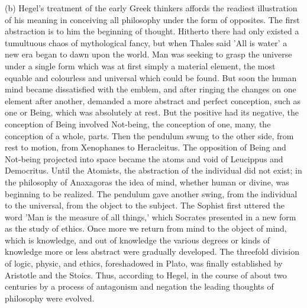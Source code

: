 \documentclass[11pt,letter]{article}
\begin{document}
\par  (b) Hegel's treatment of the early Greek thinkers affords the readiest illustration of his meaning in conceiving all philosophy under the form of opposites. The first abstraction is to him the beginning of thought. Hitherto there had only existed a tumultuous chaos of mythological fancy, but when Thales said 'All is water' a new era began to dawn upon the world. Man was seeking to grasp the universe under a single form which was at first simply a material element, the most equable and colourless and universal which could be found. But soon the human mind became dissatisfied with the emblem, and after ringing the changes on one element after another, demanded a more abstract and perfect conception, such as one or Being, which was absolutely at rest. But the positive had its negative, the conception of Being involved Not-being, the conception of one, many, the conception of a whole, parts. Then the pendulum swung to the other side, from rest to motion, from Xenophanes to Heracleitus. The opposition of Being and Not-being projected into space became the atoms and void of Leucippus and Democritus. Until the Atomists, the abstraction of the individual did not exist; in the philosophy of Anaxagoras the idea of mind, whether human or divine, was beginning to be realized. The pendulum gave another swing, from the individual to the universal, from the object to the subject. The Sophist first uttered the word 'Man is the measure of all things,' which Socrates presented in a new form as the study of ethics. Once more we return from mind to the object of mind, which is knowledge, and out of knowledge the various degrees or kinds of knowledge more or less abstract were gradually developed. The threefold division of logic, physic, and ethics, foreshadowed in Plato, was finally established by Aristotle and the Stoics. Thus, according to Hegel, in the course of about two centuries by a process of antagonism and negation the leading thoughts of philosophy were evolved.
\end{document}
